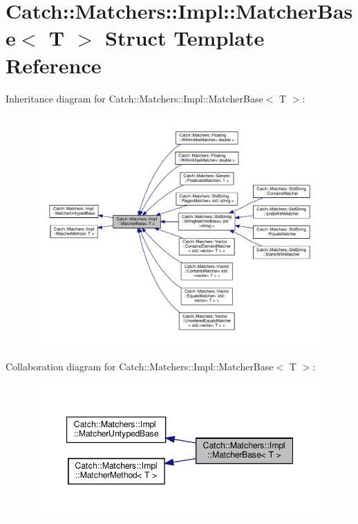 \hypertarget{structCatch_1_1Matchers_1_1Impl_1_1MatcherBase}{}\section{Catch\+::Matchers\+::Impl\+::Matcher\+Base$<$ T $>$ Struct Template Reference}
\label{structCatch_1_1Matchers_1_1Impl_1_1MatcherBase}


Inheritance diagram for Catch\+::Matchers\+::Impl\+::Matcher\+Base$<$ T $>$\+:
\nopagebreak
\begin{figure}[H]
\begin{center}
\leavevmode
\includegraphics[width=350pt]{structCatch_1_1Matchers_1_1Impl_1_1MatcherBase__inherit__graph}
\end{center}
\end{figure}


Collaboration diagram for Catch\+::Matchers\+::Impl\+::Matcher\+Base$<$ T $>$\+:
\nopagebreak
\begin{figure}[H]
\begin{center}
\leavevmode
\includegraphics[width=347pt]{structCatch_1_1Matchers_1_1Impl_1_1MatcherBase__coll__graph}
\end{center}
\end{figure}

